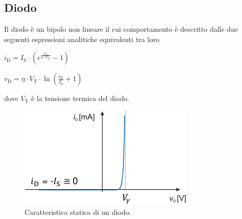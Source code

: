\documentclass[a4paper]{article}
\begin{document}
		\subsection{Diodo}
			Il diodo è un bipolo non lineare il cui comportamento è descritto dalle due seguenti espressioni analitiche equivalenti tra loro
			\newline
			\begin{center}
				$ i_{\mathrm{D}} = I_{\mathrm{S}} \cdot (e^{\mathrm{\frac{v_{\mathrm{D}}}{\eta \cdot V_{\mathrm{T}}}}} - 1) $
			\end{center}
			\newline
			\begin{center}
				$ v_{\mathrm{D}} = \eta \cdot V_{\mathrm{T}} \cdot \ln (\frac{i_{\mathrm{D}}}{I_{\mathrm{S}}} + 1) $
			\end{center}
			dove $ V_{\mathrm{T}} $ è la tensione termica del diodo.
			\begin{figure}[h!]
				\centering
				\includegraphics[scale=0.7]{caratteristicaStatica}
				\caption{Caratteristica statica di un diodo.}
				\label{fig:caratteristicaStatica}
			\end{figure}
			\newpage
\end{document}
